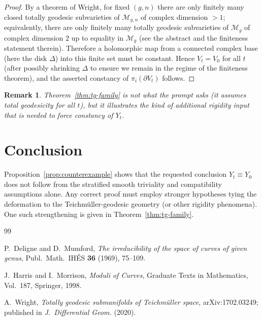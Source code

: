 \documentclass[11pt]{article}
\newtheorem{remark}[theorem]{Remark}
\newcommand{\Mg}{\mathcal M_g}
\newcommand{\D}{\Delta}
\begin{document}
\begin{proof}
By a theorem of Wright, for fixed $(g,n)$ there are only finitely many closed totally geodesic subvarieties of $\mathcal M_{g,n}$ of complex dimension $>1$; equivalently, there are only finitely many totally geodesic subvarieties of $\Mg$ of complex dimension $2$ up to equality in $\Mg$ \cite{WrightTG} (see the abstract and the finiteness statement therein). Therefore a holomorphic map from a connected complex base (here the disk $\D$) into this finite set must be constant. Hence $V_t=V_0$ for all $t$ (after possibly shrinking $\D$ to ensure we remain in the regime of the finiteness theorem), and the asserted constancy of $\pi_i(\partial V_t)$ follows.
\end{proof}

\begin{remark}
Theorem~\ref{thm:tg-family} is \emph{not} what the prompt asks (it assumes total geodesicity for all $t$), but it illustrates the kind of additional rigidity input that is needed to force constancy of $Y_t$.
\end{remark}

\section{Conclusion}

Proposition~\ref{prop:counterexample} shows that the requested conclusion $Y_t\equiv Y_0$ does not follow from the stratified smooth triviality and compatibility assumptions alone. Any correct proof must employ stronger hypotheses tying the deformation to the Teichm\"uller-geodesic geometry (or other rigidity phenomena). One such strengthening is given in Theorem~\ref{thm:tg-family}.

\begin{thebibliography}{99}

P.~Deligne and D.~Mumford,
\emph{The irreducibility of the space of curves of given genus},
Publ.\ Math.\ IH\'ES \textbf{36} (1969), 75--109.

J.~Harris and I.~Morrison,
\emph{Moduli of Curves},
Graduate Texts in Mathematics, Vol.~187, Springer, 1998.

A.~Wright,
\emph{Totally geodesic submanifolds of Teichm\"uller space},
arXiv:1702.03249; published in \emph{J.\ Differential Geom.} (2020).

\end{thebibliography}
\end{document}
